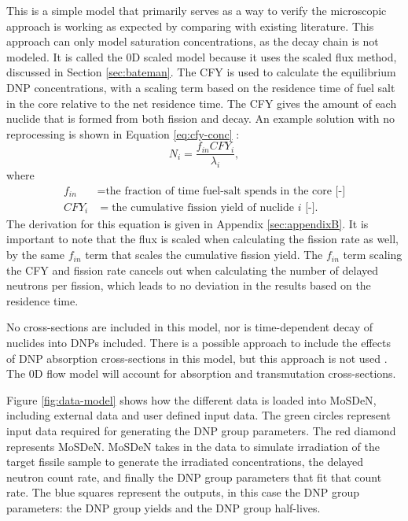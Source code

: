 This is a simple model that primarily serves as a way to verify the microscopic approach is working as expected by comparing with existing literature.
This approach can only model saturation concentrations, as the decay chain is not modeled.
It is called the 0D scaled model because it uses the scaled flux method, discussed in Section \ref{sec:bateman}.
The \gls{CFY} is used to calculate the equilibrium \gls{DNP} concentrations, with a scaling term based on the residence time of fuel salt in the core relative to the net residence time.
The \gls{CFY} gives the amount of each nuclide that is formed from both fission and decay.
An example solution with no reprocessing is shown in Equation \eqref{eq:cfy-conc} \cite{huynh2014calculation}:
\begin{equation}
    N_i = \frac{f_{in} CFY_i}{\lambda_i},
    \label{eq:cfy-conc}
\end{equation}
where
\begin{align}
    f_{in} &= \text{the fraction of time fuel-salt spends in the core [-]} \nonumber \\
    CFY_{i} &= \text{the cumulative fission yield of nuclide $i$ [-].} \nonumber
\end{align}
The derivation for this equation is given in Appendix \ref{sec:appendixB}.
It is important to note that the flux is scaled when calculating the fission rate as well, by the same $f_{in}$ term that scales the cumulative fission yield.
The $f_{in}$ term scaling the \gls{CFY} and fission rate cancels out when calculating the number of delayed neutrons per fission, which leads to no deviation in the results based on the residence time.

No cross-sections are included in this model, nor is time-dependent decay of nuclides into \glspl{DNP} included.
There is a possible approach to include the effects of \gls{DNP} absorption cross-sections in this model, but this approach is not used  \cite{shahbazi_steady-state_2022, benedictnuclear}.
The 0D flow model will account for absorption and transmutation cross-sections.

Figure \ref{fig:data-model} shows how the different data is loaded into \gls{MoSDeN}, including external data and user defined input data.
The green circles represent input data required for generating the \gls{DNP} group parameters.
The red diamond represents \gls{MoSDeN}.
\gls{MoSDeN} takes in the data to simulate irradiation of the target fissile sample to generate the irradiated concentrations, the delayed neutron count rate, and finally the \gls{DNP} group parameters that fit that count rate.
The blue squares represent the outputs, in this case the \gls{DNP} group parameters: the \gls{DNP} group yields and the \gls{DNP} group half-lives.

